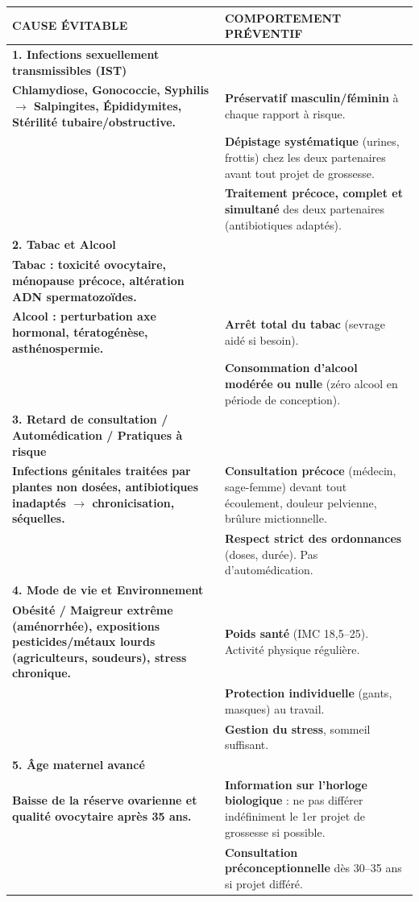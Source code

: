 \documentclass[11pt]{article}
\begin{document}
\begin{exoresolu}
\begin{exemplebox}
\begin{center}
\begin{tabularx}{\linewidth}{|>{\bfseries}X|X|}
\hline
\rowcolor{popblueL} \textbf{CAUSE ÉVITABLE} & \textbf{COMPORTEMENT PRÉVENTIF} \\
\hline
\textbf{1. Infections sexuellement transmissibles (IST)} \\
Chlamydiose, Gonococcie, Syphilis $\rightarrow$ Salpingites, Épididymites, Stérilité tubaire/obstructive. & \textbf{Préservatif masculin/féminin} à chaque rapport à risque. \\
& \textbf{Dépistage systématique} (urines, frottis) chez les deux partenaires avant tout projet de grossesse. \\
& \textbf{Traitement précoce, complet et simultané} des deux partenaires (antibiotiques adaptés). \\
\hline
\textbf{2. Tabac et Alcool} \\
Tabac : toxicité ovocytaire, ménopause précoce, altération ADN spermatozoïdes. \\
Alcool : perturbation axe hormonal, tératogénèse, asthénospermie. & \textbf{Arrêt total du tabac} (sevrage aidé si besoin). \\
& \textbf{Consommation d'alcool modérée ou nulle} (zéro alcool en période de conception). \\
\hline
\textbf{3. Retard de consultation / Automédication / Pratiques à risque} \\
Infections génitales traitées par plantes non dosées, antibiotiques inadaptés $\rightarrow$ chronicisation, séquelles. & \textbf{Consultation précoce} (médecin, sage-femme) devant tout écoulement, douleur pelvienne, brûlure mictionnelle. \\
& \textbf{Respect strict des ordonnances} (doses, durée). Pas d'automédication. \\
\hline
\textbf{4. Mode de vie et Environnement} \\
Obésité / Maigreur extrême (aménorrhée), expositions pesticides/métaux lourds (agriculteurs, soudeurs), stress chronique. & \textbf{Poids santé} (IMC 18,5--25). Activité physique régulière. \\
& \textbf{Protection individuelle} (gants, masques) au travail. \\
& \textbf{Gestion du stress}, sommeil suffisant. \\
\hline
\textbf{5. Âge maternel avancé} \\
Baisse de la réserve ovarienne et qualité ovocytaire après 35 ans. & \textbf{Information sur l'horloge biologique} : ne pas différer indéfiniment le 1er projet de grossesse si possible. \\
& \textbf{Consultation préconceptionnelle} dès 30--35 ans si projet différé. \\
\hline
\end{tabularx}
\end{center}


\end{exemplebox}
\end{exoresolu}
\end{document}
